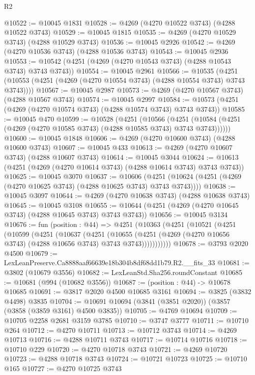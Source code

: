 \begin{lexlean}{R2}
\begin{coremodule}
@10522 := @10045 @1831
@10528 := @4269 (@4270 @10522 @3743) (@4288 @10522 @3743)
@10529 := @10045 @1815
@10535 := @4269 (@4270 @10529 @3743) (@4288 @10529 @3743)
@10536 := @10045 @2926
@10542 := @4269 (@4270 @10536 @3743) (@4288 @10536 @3743)
@10543 := @10045 @2936
@10553 := @10542 (@4251 (@4269 (@4270 @10543 @3743) (@4288 @10543 @3743) @3743 @3743))
@10554 := @10045 @2961
@10566 := @10535
    (@4251 (@10553 (@4251 (@4269 (@4270 @10554 @3743) (@4288 @10554 @3743) @3743 @3743))))
@10567 := @10045 @2987
@10573 := @4269 (@4270 @10567 @3743) (@4288 @10567 @3743)
@10574 := @10045 @2997
@10584 := @10573 (@4251 (@4269 (@4270 @10574 @3743) (@4288 @10574 @3743) @3743 @3743))
@10585 := @10045 @470
@10599 := @10528
    (@4251
      (@10566
        (@4251 (@10584 (@4251 (@4269 (@4270 @10585 @3743) (@4288 @10585 @3743) @3743 @3743))))))
@10600 := @10045 @1848
@10606 := @4269 (@4270 @10600 @3743) (@4288 @10600 @3743)
@10607 := @10045 @433
@10613 := @4269 (@4270 @10607 @3743) (@4288 @10607 @3743)
@10614 := @10045 @3044
@10624 := @10613 (@4251 (@4269 (@4270 @10614 @3743) (@4288 @10614 @3743) @3743 @3743))
@10625 := @10045 @3070
@10637 := @10606
    (@4251 (@10624 (@4251 (@4269 (@4270 @10625 @3743) (@4288 @10625 @3743) @3743 @3743))))
@10638 := @10045 @3097
@10644 := @4269 (@4270 @10638 @3743) (@4288 @10638 @3743)
@10645 := @10045 @3108
@10655 := @10644 (@4251 (@4269 (@4270 @10645 @3743) (@4288 @10645 @3743) @3743 @3743))
@10656 := @10045 @3134
@10676 := fun (position : @44) =>
  @4251
    (@10363
      (@4251
        (@10521
          (@4251
            (@10599
              (@4251
                (@10637
                  (@4251
                    (@10655
                      (@4251 (@4269 (@4270 @10656 @3743) (@4288 @10656 @3743) @3743 @3743)))))))))))
@10678 := @3793 @2020 @4500
@10679 := LexLeanPreserve.Ca8888aaf66639e18b304b8df68dd1b79.R2.__fits_33
@10681 := @3802 (@10679 @3556)
@10682 := LexLeanStd.Sha256.roundConstant
@10685 := @10681 (@994 (@10682 @3556))
@10687 := (position : @44) -> @10678 @10685
@10691 := @3817 @2020 @4500 @10685 @3161
@10694 := @3825 (@3832 @4498) @3835
@10704 := @10691 @10694 (@3841 (@3851 @2020)) (@3857 (@3858 (@3859 @3161) @4500 @3835))
@10705 := @4769 @10694
@10709 := @10705 @2258 @2681 @3159 @3785
@10710 := @3747 @3777
@10711 := @10710 @264
@10712 := @4270 @10711
@10713 := @10712 @3743
@10714 := @4269 @10713
@10716 := @4288 @10711 @3743
@10717 := @10714 @10716
@10718 := @10710 @229
@10720 := @4270 @10718 @3743
@10721 := @4269 @10720
@10723 := @4288 @10718 @3743
@10724 := @10721 @10723
@10725 := @10710 @165
@10727 := @4270 @10725 @3743

\end{coremodule}
\end{lexlean}
